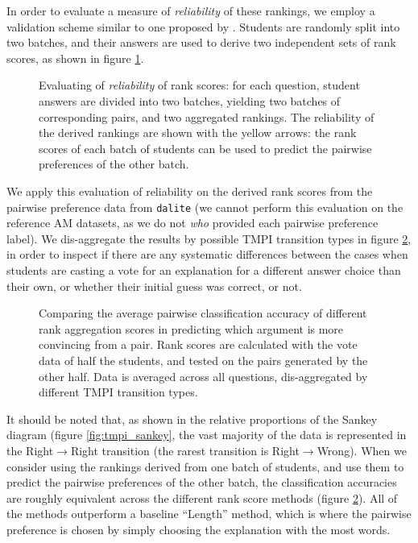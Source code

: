 \documentclass[notitlepage,12pt]{jedm}
\begin{document}
In order to evaluate a measure of \textit{reliability} of these rankings, we 
employ a validation scheme similar to one proposed by \cite{jones_peer_2015}.
Students are randomly split into two batches, and their answers are used to 
derive two independent sets of rank scores, as shown in figure 
\ref{fig:evaluate_rankings}. 


\begin{figure}[H]
	\centering
	\scalebox{0.5}{}
	\caption{
		Evaluating of \textit{reliability} of rank scores: for each question, 
		student answers are divided into two batches, yielding two batches of 
		corresponding pairs, and two aggregated rankings.
		The reliability of the derived rankings are shown with the 
		yellow arrows: the rank scores of each batch of students can be used to 
		predict the pairwise preferences of the other batch.
	}
	\label{fig:evaluate_rankings}
\end{figure}

We apply this evaluation of reliability on the derived rank scores from the 
pairwise preference data from \verb|dalite| (we cannot perform this evaluation 
on the reference AM datasets, as we do not \textit{who} provided each pairwise 
preference label). 
We dis-aggregate the results by possible TMPI transition types in figure 
\ref{fig:acc_by_batch}, in order to inspect if there are any systematic 
differences between the cases when students are casting 
a vote for an explanation for a different answer choice than their own, or 
whether their initial guess was correct, or not.

\begin{figure}[H]
	\centering
	\scalebox{0.6}{}
	\caption{
		Comparing the average pairwise classification accuracy of different 
		rank aggregation scores in predicting which argument is more convincing 
		from a pair. 
		Rank scores are calculated with the vote data of half the students, and 
		tested on the pairs generated by the other half. 
		Data is averaged across all questions, dis-aggregated by different TMPI 
		transition types. 
	}
	\label{fig:acc_by_batch}
\end{figure}

It should be noted that, as shown in the relative proportions of the Sankey 
diagram (figure \ref{fig:tmpi_sankey}, the vast majority of the data is 
represented in the Right$\rightarrow$Right transition (the rarest transition is 
Right$\rightarrow$Wrong).
When we consider using the rankings derived from one batch of students, and use 
them to predict the pairwise preferences of the other batch, the classification 
accuracies are roughly equivalent across the different rank score methods 
(figure \ref{fig:acc_by_batch}).
All of the methods outperform a baseline ``Length'' method, which is where the 
pairwise preference is chosen by simply choosing the explanation with the most 
words.
\end{document}
